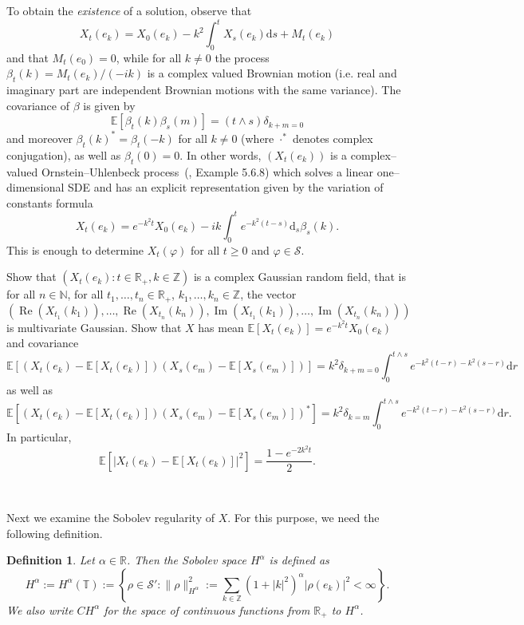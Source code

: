 \documentclass[a4paper,11pt]{article}
\newcommand{\assign}{:=}
\newcommand{\cdummy}{\cdot}
\newcommand{\mathd}{\mathrm{d}}
\newcommand{\tmop}[1]{\ensuremath{\operatorname{#1}}}
\newcommand{\tmtextit}[1]{{\itshape{#1}}}
\newtheorem{definition}{Definition}
{\theorembodyfont{\rmfamily}\newtheorem{example}{Example}}
{\theorembodyfont{\rmfamily\small\it}\newtheorem{exercise}{Exercise}}
\newcommand{\CS}{\mathscr{S}}
\begin{document}
To obtain the \tmtextit{existence} of a solution, observe that
\[ X_t (e_k) = X_0 (e_k) - k^2 \int_0^t X_s (e_k) \mathd s + M_t (e_k) \]
and that $M_t (e_0) = 0$, while for all $k \neq 0$ the process $\beta_t (k) =
M_t (e_k) / (- i k)$ is a complex valued Brownian motion (i.e. real and
imaginary part are independent Brownian motions with the same variance). The
covariance of $\beta$ is given by
\[ \mathbb{E} [\beta_t (k) \beta_s (m)] = (t \wedge s) \delta_{k + m = 0} \]
and moreover $\beta_t (k)^{\ast} = \beta_t (- k)$ for all $k \neq 0$ (where
$\cdummy^{\ast}$ denotes complex conjugation), as well as $\beta_t (0) = 0$.
In other words, $(X_t (e_k))$ is a complex--valued Ornstein--Uhlenbeck process~(\cite{karazas}, Example 5.6.8)
which solves a linear one--dimensional SDE and has an explicit representation
given by the variation of constants formula
\[ X_t (e_k) = e^{- k^2 t} X_0 (e_k) - i k \int_0^t e^{- k^2 (t - s)} \mathd_s
   \beta_s (k) . \]
This is enough to determine $X_t (\varphi)$ for all $t \geqslant 0$ and
$\varphi \in \CS$.

\begin{exercise}
  Show that $(X_t (e_k) : t \in \mathbb{R}_+, k \in \mathbb{Z})$ is a
  complex Gaussian random field, that is for all $n \in \mathbb{N}$, for all
  $t_1, \ldots, t_n \in \mathbb{R}_+$, $k_1, \ldots, k_n \in \mathbb{Z}$,
  the vector
  \[ (\tmop{Re} (X_{t_1} (k_1)), \ldots, \tmop{Re} (X_{t_n} (k_n)), \tmop{Im}
     (X_{t_1} (k_1)), \ldots, \tmop{Im} (X_{t_n} (k_n))) \]
  is multivariate Gaussian. Show that $X$ has mean $\mathbb{E} [X_t (e_k)] =
  e^{- k^2 t} X_0 (e_k)$ and covariance
  \[ \mathbb{E} [(X_t (e_k) -\mathbb{E} [X_t (e_k)]) (X_s (e_m) -\mathbb{E}
     [X_s (e_m)])] = k^2 \delta_{k + m = 0} \int_0^{t \wedge s} e^{- k^2 (t -
     r) - k^2 (s - r)} \mathd r \]
  as well as
  \[ \mathbb{E} [(X_t (e_k) -\mathbb{E} [X_t (e_k)]) (X_s (e_m) -\mathbb{E}
     [X_s (e_m)])^{\ast}] = k^2 \delta_{k = m} \int_0^{t \wedge s} e^{- k^2 (t
     - r) - k^2 (s - r)} \mathd r. \]
  In particular,
  \[ \mathbb{E} [| X_t (e_k) -\mathbb{E} [X_t (e_k)] |^2] = \frac{1 - e^{- 2
     k^2 t}}{2} . \]
\end{exercise}

\

Next we examine the Sobolev regularity of $X$. For this purpose, we need the
following definition.

\begin{definition}
  Let $\alpha \in \mathbb{R}$. Then the Sobolev space $H^{\alpha}$ is defined
  as
  \[ H^{\alpha} \assign H^{\alpha} (\mathbb{T}) \assign \left\{ \rho \in \CS'
     : \| \rho \|^2_{H^{\alpha}} \assign \sum_{k \in \mathbb{Z}} (1 + | k
     |^2)^{\alpha} | \rho (e_k) |^2 < \infty \right\} . \]
  We also write $C H^{\alpha}$ for the space of continuous functions from
  $\mathbb{R}_+$ to $H^{\alpha}$.
\end{definition}
\end{document}
